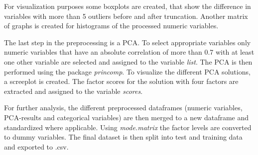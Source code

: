 For visualization purposes some boxplots are created, that show the difference in variables with more than 5 outliers before and after truncation. Another matrix of graphs is created for histograms of the processed numeric variables. 

The last step in the preprocessing is a PCA. To select appropriate variables only numeric variables that have an absolute correlation of more than 0.7 with at least one other variable are selected and assigned to the variable \textit{list}.  The PCA is then performed using the package \textit{princomp}.
To visualize the different PCA solutions, a screeplot  is created. The factor scores for the solution with four factors are extracted and assigned to the variable \textit{scores}. 

For further analysis, the different preprocessed dataframes (numeric variables, PCA-results and categorical variables) are then merged to a new dataframe and standardized where applicable. Using \textit{mode.matrix} the factor levels are converted to dummy variables. The final dataset is then split into test and training data and exported to .csv.
